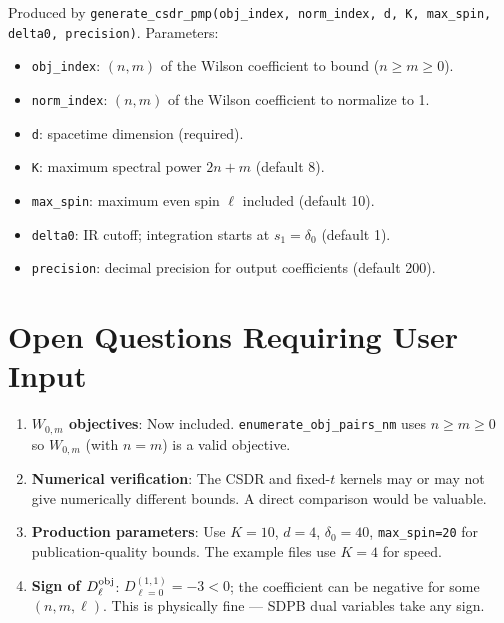 \documentclass{article}
\begin{document}
Produced by \texttt{generate\_csdr\_pmp(obj\_index, norm\_index, d, K, max\_spin, delta0, precision)}.
Parameters:
\begin{itemize}
  \item \texttt{obj\_index}: $(n,m)$ of the Wilson coefficient to bound ($n\ge m\ge0$).
  \item \texttt{norm\_index}: $(n,m)$ of the Wilson coefficient to normalize to 1.
  \item \texttt{d}: spacetime dimension (required).
  \item \texttt{K}: maximum spectral power $2n+m$ (default 8).
  \item \texttt{max\_spin}: maximum even spin $\ell$ included (default 10).
  \item \texttt{delta0}: IR cutoff; integration starts at $s_1=\delta_0$ (default 1).
  \item \texttt{precision}: decimal precision for output coefficients (default 200).
\end{itemize}

\section{Open Questions Requiring User Input}

\begin{enumerate}
  \item \textbf{$W_{0,m}$ objectives}: Now included. \texttt{enumerate\_obj\_pairs\_nm} uses
        $n \ge m \ge 0$ so $W_{0,m}$ (with $n=m$) is a valid objective.
  \item \textbf{Numerical verification}: The CSDR and fixed-$t$ kernels may or may not
        give numerically different bounds.  A direct comparison would be valuable.
  \item \textbf{Production parameters}: Use $K=10$, $d=4$, $\delta_0=40$, \texttt{max\_spin=20}
        for publication-quality bounds.  The example files use $K=4$ for speed.
  \item \textbf{Sign of $D_\ell^{\rm obj}$}: $D_{\ell=0}^{(1,1)} = -3 < 0$; the coefficient
        can be negative for some $(n,m,\ell)$.  This is physically fine — SDPB dual
        variables take any sign.
\end{enumerate}
\end{document}
